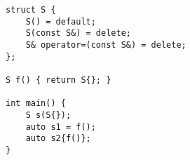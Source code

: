 \begin{lstlisting}[title=\href{https://godbolt.org/z/hmgWHY}{\texttt{godbolt.org/z/hmgWHY}}]
struct S {
    S() = default;
    S(const S&) = delete;
    S& operator=(const S&) = delete;
};

S f() { return S{}; }

int main() {
    S s(S{});
    auto s1 = f();
    auto s2{f()};
}
\end{lstlisting}
